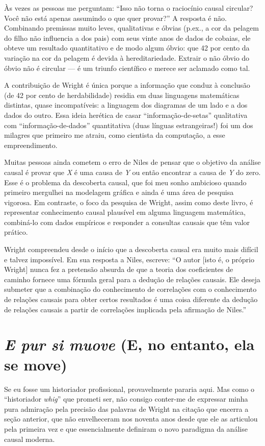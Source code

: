 \documentclass[11pt,a5paper,twoside]{book}
\begin{document}
Às vezes as pessoas me perguntam: “Isso não torna o raciocínio causal circular? Você não está apenas assumindo o que quer provar?” A resposta é não. Combinando premissas muito leves, qualitativas e óbvias (p.ex., a cor da pelagem do filho não influencia a dos pais) com seus vinte anos de dados de cobaias, ele obteve um resultado quantitativo e de modo algum óbvio: que 42 por cento da variação na cor da pelagem é devida à hereditariedade. Extrair o não óbvio do óbvio não é circular — é um triunfo científico e merece ser aclamado como tal.

A contribuição de Wright é única porque a informação que conduz à conclusão (de 42 por cento de herdabilidade) residia em duas linguagens matemáticas distintas, quase incompatíveis: a linguagem dos diagramas de um lado e a dos dados do outro. Essa ideia herética de casar “informação-de-setas” qualitativa com “informação-de-dados” quantitativa (duas línguas estrangeiras!) foi um dos milagres que primeiro me atraiu, como cientista da computação, a esse empreendimento.

Muitas pessoas ainda cometem o erro de Niles de pensar que o objetivo da análise causal é provar que \textit{X} é uma causa de \textit{Y} ou então encontrar a causa de \textit{Y} do zero. Esse é o problema da descoberta causal, que foi meu sonho ambicioso quando primeiro mergulhei na modelagem gráfica e ainda é uma área de pesquisa vigorosa. Em contraste, o foco da pesquisa de Wright, assim como deste livro, é representar conhecimento causal plausível em alguma linguagem matemática, combiná-lo com dados empíricos e responder a consultas causais que têm valor prático.

Wright compreendeu desde o início que a descoberta causal era muito mais difícil e talvez impossível. Em sua resposta a Niles, escreve: “O autor [isto é, o próprio Wright] nunca fez a pretensão absurda de que a teoria dos coeficientes de caminho fornece uma fórmula geral para a dedução de relações causais. Ele deseja submeter que a combinação do conhecimento de correlações com o conhecimento de relações causais para obter certos resultados é uma coisa diferente da dedução de relações causais a partir de correlações implicada pela afirmação de Niles.”

\section{\textit{E pur si muove} (E, no entanto, ela se move)}
Se eu fosse um historiador profissional, provavelmente pararia aqui. Mas como o “historiador \textit{whig}” que prometi ser, não consigo conter-me de expressar minha pura admiração pela precisão das palavras de Wright na citação que encerra a seção anterior, que não envelheceram nos noventa anos desde que ele as articulou pela primeira vez e que essencialmente definiram o novo paradigma da análise causal moderna.
\end{document}
